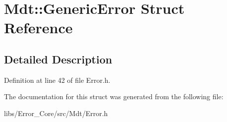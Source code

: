 \hypertarget{struct_mdt_1_1_generic_error}{}\section{Mdt\+:\+:Generic\+Error Struct Reference}
\label{struct_mdt_1_1_generic_error}


\subsection{Detailed Description}


Definition at line 42 of file Error.\+h.



The documentation for this struct was generated from the following file\+:\begin{DoxyCompactItemize}
\item 
libs/\+Error\+\_\+\+Core/src/\+Mdt/Error.\+h\end{DoxyCompactItemize}
